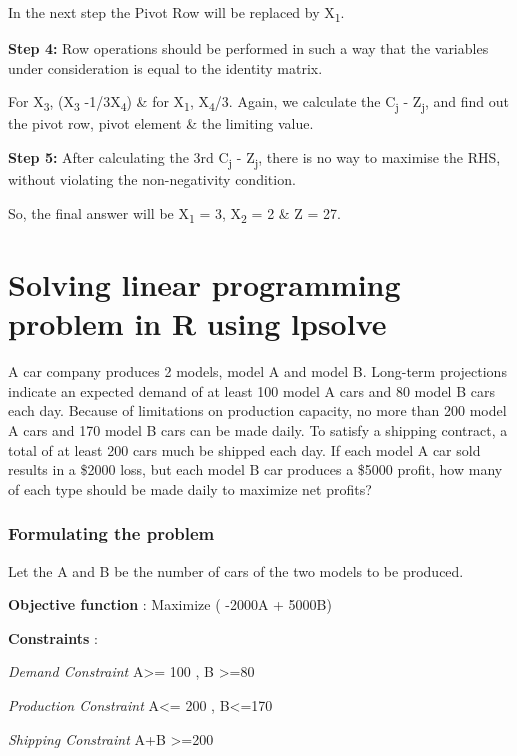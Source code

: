 \documentclass[]{article}
\begin{document}
In the next step the Pivot Row will be replaced by X\textsubscript{1}.

\textbf{Step 4:} Row operations should be performed in such a way that
the variables under consideration is equal to the identity matrix.

For X\textsubscript{3}, (X\textsubscript{3} -1/3X\textsubscript{4}) \&
for X\textsubscript{1}, X\textsubscript{4}/3. Again, we calculate the
C\textsubscript{j} - Z\textsubscript{j}, and find out the pivot row,
pivot element \& the limiting value.

\textbf{Step 5:} After calculating the 3rd C\textsubscript{j} -
Z\textsubscript{j}, there is no way to maximise the RHS, without
violating the non-negativity condition.

So, the final answer will be X\textsubscript{1} = 3, X\textsubscript{2}
= 2 \& Z = 27.

\section{Solving linear programming problem in R using
lpsolve}\label{solving-linear-programming-problem-in-r-using-lpsolve}

A car company produces 2 models, model A and model B. Long-term
projections indicate an expected demand of at least 100 model A cars and
80 model B cars each day. Because of limitations on production capacity,
no more than 200 model A cars and 170 model B cars can be made daily. To
satisfy a shipping contract, a total of at least 200 cars much be
shipped each day. If each model A car sold results in a \$2000 loss, but
each model B car produces a \$5000 profit, how many of each type should
be made daily to maximize net profits?

\subsubsection{Formulating the problem}\label{formulating-the-problem}

Let the A and B be the number of cars of the two models to be produced.

\textbf{Objective function} : Maximize ( -2000A + 5000B)

\textbf{Constraints} :

\emph{Demand Constraint} A\textgreater{}= 100 , B \textgreater{}=80

\emph{Production Constraint} A\textless{}= 200 , B\textless{}=170

\emph{Shipping Constraint} A+B \textgreater{}=200
\end{document}

